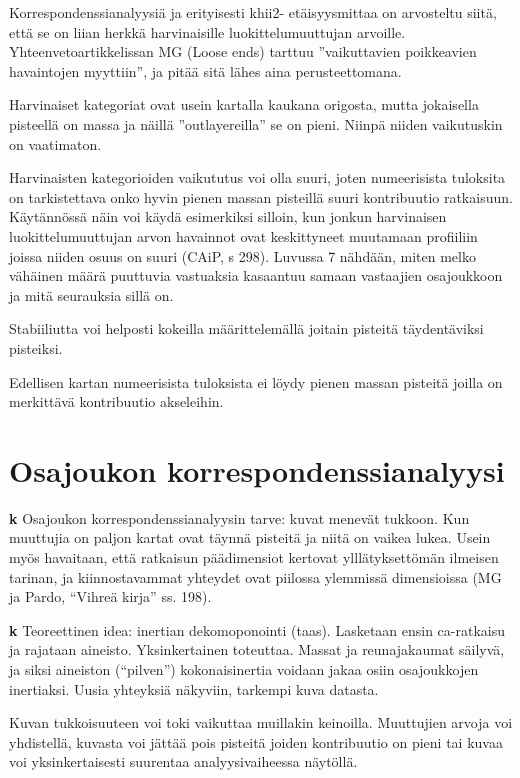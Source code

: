 \documentclass[
  finnish,
]{book}
\begin{document}
Korrespondenssianalyysiä ja erityisesti khii2- etäisyysmittaa on arvosteltu siitä,
että se on liian herkkä harvinaisille luokittelumuuttujan arvoille.
Yhteenvetoartikkelissan MG (Loose ends) tarttuu ''vaikuttavien poikkeavien
havaintojen myyttiin'', ja pitää sitä lähes aina perusteettomana.

Harvinaiset kategoriat ovat usein kartalla kaukana origosta, mutta jokaisella
pisteellä on massa ja näillä ''outlayereilla'' se on pieni. Niinpä niiden
vaikutuskin on vaatimaton.

Harvinaisten kategorioiden vaikututus voi olla suuri, joten numeerisista
tuloksita on tarkistettava onko hyvin pienen massan pisteillä suuri kontribuutio
ratkaisuun. Käytännössä näin voi käydä esimerkiksi silloin, kun jonkun
harvinaisen luokittelumuuttujan arvon havainnot ovat keskittyneet muutamaan
profiiliin joissa niiden osuus on suuri (CAiP, s 298). Luvussa 7 nähdään, miten
melko vähäinen määrä puuttuvia vastuaksia kasaantuu samaan vastaajien osajoukkoon
ja mitä seurauksia sillä on.

Stabiiliutta voi helposti kokeilla määrittelemällä joitain pisteitä täydentäviksi
pisteiksi.

Edellisen kartan numeerisista tuloksista ei löydy pienen massan pisteitä joilla
on merkittävä kontribuutio akseleihin.

\hypertarget{osajoukon-korrespondenssianalyysi}{%
\chapter{Osajoukon korrespondenssianalyysi}\label{osajoukon-korrespondenssianalyysi}}

\textbf{k} Osajoukon korrespondenssianalyysin tarve: kuvat menevät tukkoon. Kun muuttujia
on paljon kartat ovat täynnä pisteitä ja niitä on vaikea lukea. Usein myös havaitaan,
että ratkaisun päädimensiot kertovat ylllätyksettömän ilmeisen tarinan, ja
kiinnostavammat yhteydet ovat piilossa ylemmissä dimensioissa (MG ja Pardo, ``Vihreä
kirja'' ss. 198).

\textbf{k} Teoreettinen idea: inertian dekomoponointi (taas). Lasketaan ensin
ca-ratkaisu ja rajataan aineisto. Yksinkertainen toteuttaa. Massat ja reunajakaumat
säilyvä, ja siksi aineiston (``pilven'') kokonaisinertia voidaan jakaa osiin
osajoukkojen inertiaksi. Uusia yhteyksiä näkyviin, tarkempi kuva datasta.

Kuvan tukkoisuuteen voi toki vaikuttaa muillakin keinoilla. Muuttujien arvoja voi
yhdistellä, kuvasta voi jättää pois pisteitä joiden kontribuutio on pieni tai kuvaa
voi yksinkertaisesti suurentaa analyysivaiheessa näytöllä.
\end{document}
